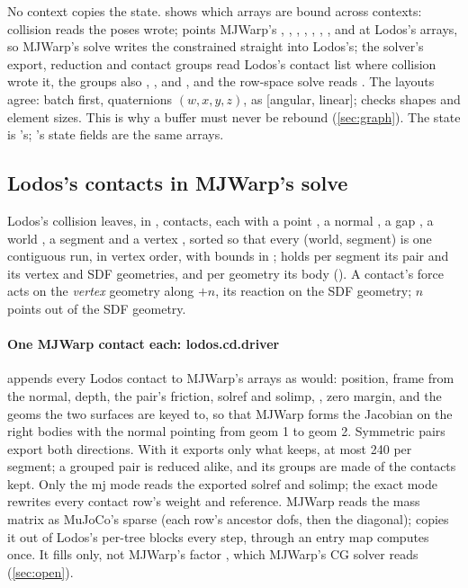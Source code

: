 No context copies the state.  shows which arrays are bound across contexts: collision reads the poses  wrote;  points MJWarp's , , , , , , ,  and  at Lodos's arrays, so MJWarp's solve writes the constrained  straight into Lodos's; the solver's export, reduction and contact groups read Lodos's contact list where collision wrote it, the groups also , ,  and , and the row-space solve reads . The layouts agree: batch first, quaternions $(w, x, y, z)$,  as [angular, linear];  checks shapes and element sizes. This is why a buffer must never be rebound (\cref{sec:graph}). The state is 's; 's state fields are the same arrays.

\subsection{Lodos's contacts in MJWarp's solve}\label{sec:bridges}

Lodos's collision leaves, in ,  contacts, each with a point , a normal , a gap , a world , a segment  and a vertex , sorted so that every (world, segment) is one contiguous run, in vertex order, with bounds in ;  holds per segment its pair and its vertex and SDF geometries, and per geometry its body (). A contact's force acts on the \emph{vertex} geometry along $+n$, its reaction on the SDF geometry; $n$ points out of the SDF geometry.

\paragraph{One MJWarp contact each: lodos.cd.driver}  appends every Lodos contact to MJWarp's arrays as  would: position, frame from the normal, depth, the pair's friction, solref and solimp, , zero margin, and the geoms  the two surfaces are keyed to, so that MJWarp forms the Jacobian on the right bodies with the normal pointing from geom 1 to geom 2. Symmetric pairs export both directions. With  it exports only what  keeps, at most 240 per segment; a grouped pair is reduced alike, and its groups are made of the contacts kept. Only the mj mode reads the exported solref and solimp; the exact mode rewrites every contact row's weight and reference. MJWarp reads the mass matrix as MuJoCo's sparse  (each row's ancestor dofs, then the diagonal);  copies it out of Lodos's per-tree blocks every step, through an entry map  computes once. It fills  only, not MJWarp's factor , which MJWarp's CG solver reads (\cref{sec:open}).

